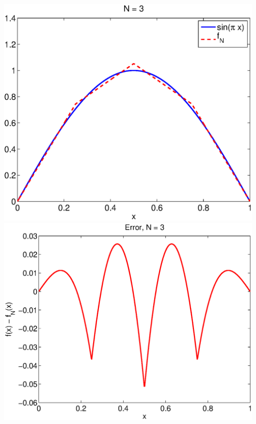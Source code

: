 \begin{solution}
\begin{enumerate}
\begin{center}
   \includegraphics[scale=0.4]{f_3a}\quad 
   \includegraphics[scale=0.4]{f_3b}


\end{center}
\end{enumerate}
\end{solution}
